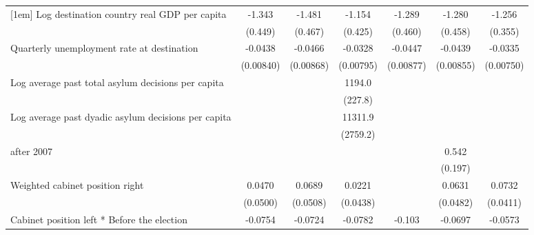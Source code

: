 \begin{table}[htbp]
\begin{tabular}{l*{6}{c}}
[1em]
Log destination country real GDP per capita&      -1.343\sym{**} &      -1.481\sym{**} &      -1.154\sym{**} &      -1.289\sym{**} &      -1.280\sym{**} &      -1.256\sym{***}\\
                    &     (0.449)         &     (0.467)         &     (0.425)         &     (0.460)         &     (0.458)         &     (0.355)         \\
[1em]
Quarterly unemployment rate at destination&     -0.0438\sym{***}&     -0.0466\sym{***}&     -0.0328\sym{***}&     -0.0447\sym{***}&     -0.0439\sym{***}&     -0.0335\sym{***}\\
                    &   (0.00840)         &   (0.00868)         &   (0.00795)         &   (0.00877)         &   (0.00855)         &   (0.00750)         \\
[1em]
Log average past total asylum decisions per capita&                     &                     &      1194.0\sym{***}&                     &                     &                     \\
                    &                     &                     &     (227.8)         &                     &                     &                     \\
[1em]
Log average past dyadic asylum decisions per capita&                     &                     &     11311.9\sym{***}&                     &                     &                     \\
                    &                     &                     &    (2759.2)         &                     &                     &                     \\
[1em]
after 2007          &                     &                     &                     &                     &       0.542\sym{**} &                     \\
                    &                     &                     &                     &                     &     (0.197)         &                     \\
[1em]
Weighted cabinet position right&      0.0470         &      0.0689         &      0.0221         &                     &      0.0631         &      0.0732         \\
                    &    (0.0500)         &    (0.0508)         &    (0.0438)         &                     &    (0.0482)         &    (0.0411)         \\
[1em]
Cabinet position left * Before the election&     -0.0754\sym{**} &     -0.0724\sym{**} &     -0.0782\sym{**} &      -0.103\sym{***}&     -0.0697\sym{**} &     -0.0573\sym{**} \\

\end{tabular}
\end{table}
